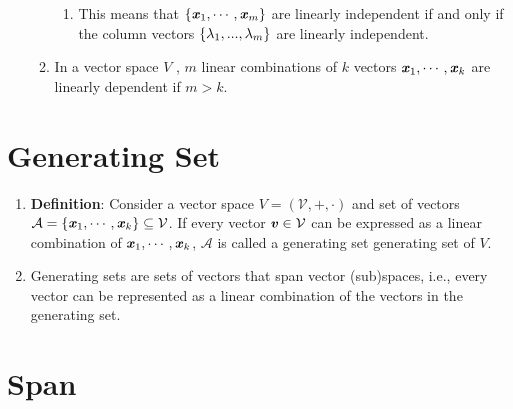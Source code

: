 \begin{enumerate}
\begin{enumerate}
\begin{enumerate}
            \item This means that $\left\{\text{\textbf{\textit{x}}}_1, \cdots , \text{\textbf{\textit{x}}}_m\right\}$ are linearly independent if and only if the column vectors $\left\{\lambda_1, . . . , \lambda_m\right\}$ are linearly independent.
            \hfill \cite{mfml/book/mml/Deisenroth-Faisal-Ong}
        \end{enumerate}

        \item In a vector space $V$ , $m$ linear combinations of $k$ vectors $\text{\textbf{\textit{x}}}_1, \cdots , \text{\textbf{\textit{x}}}_k$ are linearly dependent if $m > k$.
        \hfill \cite{mfml/book/mml/Deisenroth-Faisal-Ong}
    \end{enumerate}
\end{enumerate}





\section{Generating Set}

\begin{enumerate}
    \item \textbf{Definition}: Consider a vector space $V = (\mathcal{V}, +, \cdot)$ and set of vectors $\mathcal{A} = \left\{\text{\textbf{\textit{x}}}_1, \cdots , \text{\textbf{\textit{x}}}_k\right\} \subseteq \mathcal{V}$. 
    If every vector $\text{\textbf{\textit{v}}} \in \mathcal{V}$ can be expressed as a linear combination of $\text{\textbf{\textit{x}}}_1, \cdots , \text{\textbf{\textit{x}}}_k$, $\mathcal{A}$ is called a generating set generating set of $V$.
    \hfill \cite{mfml/book/mml/Deisenroth-Faisal-Ong}

    \item Generating sets are sets of vectors that span vector (sub)spaces, i.e., every vector can be represented as a linear combination of the vectors in the generating set.
    \hfill \cite{mfml/book/mml/Deisenroth-Faisal-Ong}
\end{enumerate}








\section{Span}

